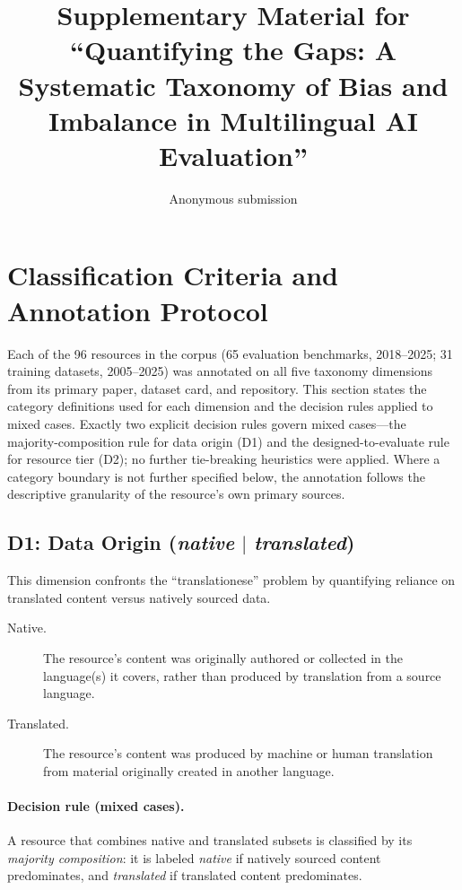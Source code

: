 \documentclass[letterpaper]{article}
\title{Supplementary Material for ``Quantifying the Gaps: A Systematic Taxonomy of Bias and Imbalance in Multilingual AI Evaluation''}
\author{Anonymous submission}
\begin{document}
\maketitle

\section{Classification Criteria and Annotation Protocol}
\label{sec:criteria}

Each of the 96 resources in the corpus (65 evaluation benchmarks, 2018--2025; 31 training datasets, 2005--2025) was annotated on all five taxonomy dimensions from its primary paper, dataset card, and repository. This section states the category definitions used for each dimension and the decision rules applied to mixed cases. Exactly two explicit decision rules govern mixed cases---the majority-composition rule for data origin (D1) and the designed-to-evaluate rule for resource tier (D2); no further tie-breaking heuristics were applied. Where a category boundary is not further specified below, the annotation follows the descriptive granularity of the resource's own primary sources.

\subsection{D1: Data Origin (\emph{native} $|$ \emph{translated})}
This dimension confronts the ``translationese'' problem by quantifying reliance on translated content versus natively sourced data.
\begin{description}
\item[Native.] The resource's content was originally authored or collected in the language(s) it covers, rather than produced by translation from a source language.
\item[Translated.] The resource's content was produced by machine or human translation from material originally created in another language.
\end{description}
\paragraph{Decision rule (mixed cases).} A resource that combines native and translated subsets is classified by its \emph{majority composition}: it is labeled \emph{native} if natively sourced content predominates, and \emph{translated} if translated content predominates.
\end{document}
